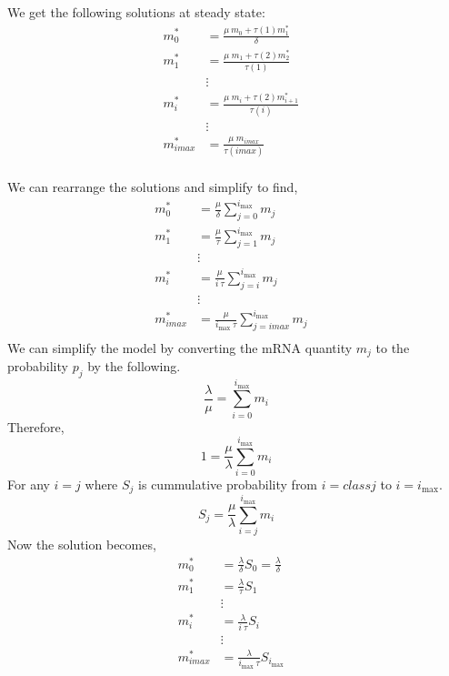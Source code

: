 \documentclass[review]{elsarticle}
\newcommand{\imax}{\ensuremath{i_{\max}}\xspace}
\begin{document}
We get the following solutions at steady state:
\begin{align*}
m_{0}^{*}  &= \frac{\mu\: m_{0}+\tau(1)m_{1}^{*}}{\delta} \\
m_{1}^{*}  &= \frac{\mu \; m_{1}+\tau(2)m_{2}^{*}}{\tau(1)} \\
& \vdots & \\
m_{i}^{*}  &= \frac{\mu \; m_{i}+\tau(2)m_{i+1}^{*}}{\tau(i)} \\
& \vdots & \\
m_{imax}^{*}  &= \frac{\mu \; m_{imax}}{\tau(imax)} \\
\end{align*}

We can rearrange the solutions and simplify to find,
\begin{align*}
m_{0}^{*}  &= \frac{\mu}{\delta}\sum_{j=0}^{\imax}m_{j} \\
m_{1}^{*}  &= \frac{\mu}{\tau}\sum_{j=1}^{\imax}m_{j}  \\
& \vdots & \\
m_{i}^{*}  &= \frac{\mu}{i \: \tau}\sum_{j=i}^{\imax}m_{j}  \\
& \vdots & \\
m_{imax}^{*}  &= \frac{\mu}{\imax \: \tau}\sum_{j=imax}^{\imax}m_{j}  \\
\end{align*}
We can simplify the model by converting the mRNA quantity $m_{j}$ to the probability $p_{j}$ by the following.
\begin{equation}
	\frac{\lambda}{\mu}=\sum_{i=0}^{\imax}m_{i}
\end{equation}
Therefore,
\begin{equation}
		1= \frac{\mu}{\lambda}\sum_{i=0}^{\imax}m_{i}
\end{equation}
For any $i=j$ where $S_{j}$ is cummulative probability from $i=class j$ to $ i= \imax$.
\begin{equation}
		S_{j} = \frac{\mu}{\lambda}\sum_{i=j}^{\imax}m_{i}
\end{equation}
Now the solution becomes,
\begin{align*}
m_{0}^{*}  &= \frac{\lambda}{\delta}S_{0}=\frac{\lambda}{\delta} \\
m_{1}^{*}  &= \frac{\lambda}{\tau}S_{1} \\
& \vdots & \\
m_{i}^{*}  &= \frac{\lambda}{i \: \tau}S_{i}  \\
& \vdots & \\
m_{imax}^{*}  &= \frac{\lambda}{\imax \: \tau}S_{\imax}  \\
\end{align*}
\end{document}

